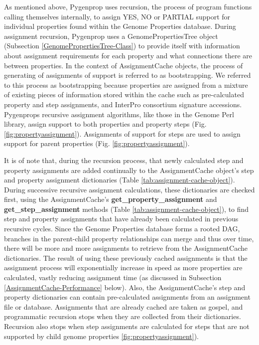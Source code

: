 As mentioned above, Pygenprop uses recursion, the process of program functions calling themselves internally, to assign YES, NO or PARTIAL support for individual properties found within the Genome Properties database. During assignment recursion, Pygenprop uses a GenomePropertiesTree object (Subsection \ref{GenomePropertiesTree-Class}) to provide itself with information about assignment requirements for each property and what connections there are between properties. In the context of AssignmentCache objects, the process of generating of assignments of support is referred to as bootstrapping. We referred to this process as bootstrapping because properties are assigned from a mixture of existing pieces of information stored within the cache such as pre-calculated property and step assignments, and InterPro consortium signature accessions. Pygenprops recursive assignment algorithms, like those in the Genome Perl library, assign support to both properties and property steps (Fig. \ref{fig:propertyassignment}). Assignments of support for steps are used to assign support for parent properties (Fig. \ref{fig:propertyassignment}).

It is of note that, during the recursion process, that newly calculated step and property assignments are added continually to the AssignmentCache object's step and property assignment dictionaries (Table \ref{tab:assignment-cache-object}). During successive recursive assignment calculations, these dictionaries are checked first, using the AssignmentCache's \textbf{get\_property\_assignment} and \textbf{get\_step\_assignment} methods (Table \ref{tab:assignment-cache-object}), to find step and property assignments that have already been calculated in previous recursive cycles. Since the Genome Properties database forms a rooted DAG, branches in the parent-child property relationships can merge and thus over time, there will be more and more assignments to retrieve from the AssignmentCache dictionaries. The result of using these previously cached assignments is that the assignment process will exponentially increase in speed as more properties are calculated, vastly reducing assignment time (as discussed in Subsection \ref{AssignmentCache-Performance} below). Also, the AssignmentCache's step and property dictionaries can contain pre-calculated assignments from an assignment file or database. Assignments that are already cached are taken as gospel, and programmatic recursion stops when they are collected from their dictionaries. Recursion also stops when step assignments are calculated for steps that are not supported by child genome properties \ref{fig:propertyassignment}).

